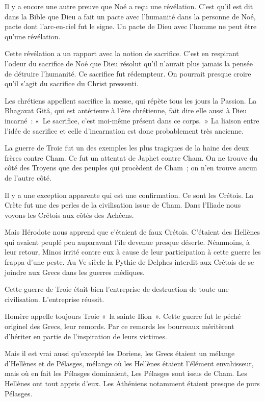 \documentclass[french,twoside]{book} %
\begin{document}
\noindent Il y a encore une autre preuve que Noé a reçu une révélation. C'est qu'il est dit dans la Bible que Dieu a fait un pacte avec l'humanité dans la personne de Noé, pacte dont l'arc-en-ciel fut le signe. Un pacte de Dieu avec l'homme ne peut être qu'une révélation.\par
Cette révélation a un rapport avec la notion de sacrifice. C'est en respirant l'odeur du sacrifice de Noé que Dieu résolut qu'il n'aurait plus jamais la pensée de détruire l'humanité. Ce sacrifice fut rédempteur. On pourrait presque croire qu'il s'agit du sacrifice du Christ pressenti.\par
Les chrétiens appellent sacrifice la messe, qui répète tous les jours la Passion. La Bhagavat Gitâ, qui est antérieure à l'ère chrétienne, fait dire elle aussi à Dieu incarné : « Le sacrifice, c'est moi-même présent dans ce corps. » La liaison entre l'idée de sacrifice et celle d'incarnation est donc probablement très ancienne.\par
La guerre de Troie fut un des exemples les plus tragiques de la haine des deux frères contre Cham. Ce fut un attentat de Japhet contre Cham. On ne trouve du côté des Troyens que des peuples qui procèdent de Cham ; on n'en trouve aucun de l'autre côté.\par
Il y a une exception apparente qui est une confirmation. Ce sont les Crétois. La Crète fut une des perles de la civilisation issue de Cham. Dans l'Iliade nous voyons les Crétois aux côtés des Achéens.\par
Mais Hérodote nous apprend que c'étaient de faux Crétois. C'étaient des Hellènes qui avaient peuplé peu auparavant l'île devenue presque déserte. Néanmoins, à leur retour, Minos irrité contre eux à cause de leur participation à cette guerre les frappa d'une peste. Au Ve siècle la Pythie de Delphes interdit aux Crétois de se joindre aux Grecs dans les guerres médiques.\par
Cette guerre de Troie était bien l'entreprise de destruction de toute une civilisation. L'entreprise réussit.\par
Homère appelle toujours Troie « la sainte Ilion ». Cette guerre fut le péché originel des Grecs, leur remords. Par ce remords les bourreaux méritèrent d'hériter en partie de l'inspiration de leurs victimes.\par
Mais il est vrai aussi qu'excepté les Doriens, les Grecs étaient un mélange d'Hellènes et de Pélasges, mélange où les Hellènes étaient l'élément envahisseur, mais où en fait les Pélasges dominaient, Les Pélasges sont issus de Cham. Les Hellènes ont tout appris d'eux. Les Athéniens notamment étaient presque de purs Pélasges.\par
\end{document}
